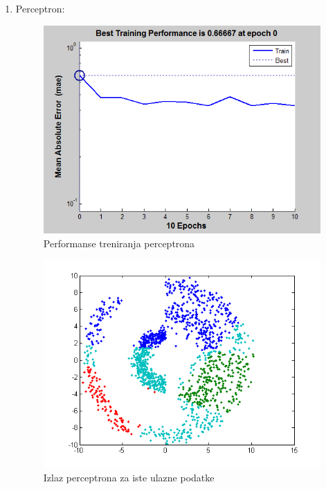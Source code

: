 \documentclass{report}
\begin{document}
\begin{enumerate}
\newpage
\begin{enumerate}
\item\LARGE
Perceptron:\large

\begin{figure}[!h]
\begin{center}
\includegraphics[scale=0.8]{B1performancePerceptron.png}
\caption{Performanse treniranja perceptrona}
\end{center}
\end{figure}

\begin{figure}[!h]
\begin{center}
\includegraphics[scale=0.8]{B1outputPerceptronSame.png}
\caption{Izlaz perceptrona za iste ulazne podatke}
\end{center}
\end{figure}


\end{enumerate}
\end{enumerate}
\end{document}
